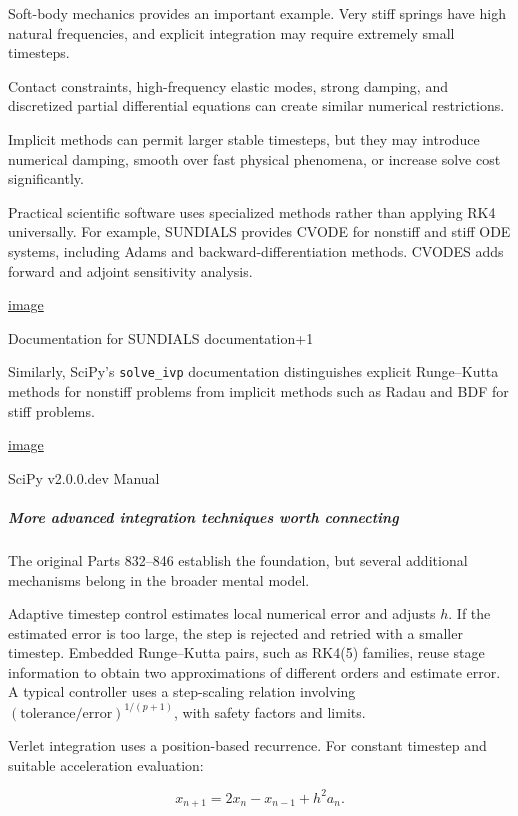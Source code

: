 Soft-body mechanics provides an important example. Very stiff springs have high natural frequencies, and explicit integration may require extremely small timesteps.

Contact constraints, high-frequency elastic modes, strong damping, and discretized partial differential equations can create similar numerical restrictions.

Implicit methods can permit larger stable timesteps, but they may introduce numerical damping, smooth over fast physical phenomena, or increase solve cost significantly.

Practical scientific software uses specialized methods rather than applying RK4 universally. For example, SUNDIALS provides CVODE for nonstiff and stiff ODE systems, including Adams and backward-differentiation methods. CVODES adds forward and adjoint sensitivity analysis. 

\href{https://www.google.com/s2/favicons?domain=https://sundials.readthedocs.io&sz=32}{image}

Documentation for SUNDIALS documentation+1

Similarly, SciPy's \texttt{solve\_ivp} documentation distinguishes explicit Runge--Kutta methods for nonstiff problems from implicit methods such as Radau and BDF for stiff problems. 

\href{https://www.google.com/s2/favicons?domain=https://scipy.github.io&sz=32}{image}

SciPy v2.0.0.dev Manual

\subparagraph{More advanced integration techniques worth connecting}\label{02-foundations-ii-ch025-more-advanced-integration-techniques-worth-connecting}

The original Parts 832--846 establish the foundation, but several additional mechanisms belong in the broader mental model.

Adaptive timestep control estimates local numerical error and adjusts \(h\). If the estimated error is too large, the step is rejected and retried with a smaller timestep. Embedded Runge--Kutta pairs, such as RK4(5) families, reuse stage information to obtain two approximations of different orders and estimate error. A typical controller uses a step-scaling relation involving \((\text{tolerance}/\text{error})^{1/(p+1)}\), with safety factors and limits.

Verlet integration uses a position-based recurrence. For constant timestep and suitable acceleration evaluation:

\[
x_{n+1}=2x_n-x_{n-1}+h^2a_n.
\]

